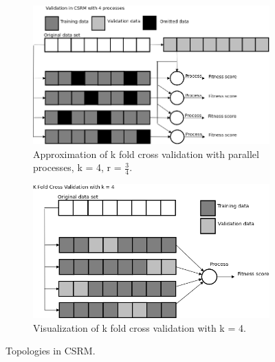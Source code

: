 \begin{figure}
	\begin{subfigure}{0.5\textwidth}\label{fig:csrmkfold}
    \includegraphics[width=\textwidth,height=\textheight,keepaspectratio]{figures/validationcsrm.png}
    \caption{Approximation of k fold cross validation with parallel processes, k = 4,  r = $\frac{3}{4}$.}
    \end{subfigure}
	\begin{subfigure}{0.5\textwidth}    \label{fig:kfold}

    \centering
    \includegraphics[width=\textwidth,height=\textheight,keepaspectratio]{figures/kfold.png}
    \caption{Visualization of k fold cross validation with k = 4.}
    \label{fig:kfold}
    \end{subfigure}%
    \caption{Topologies in CSRM.}
    \label{fig:ckfold}
 \end{figure}
%
